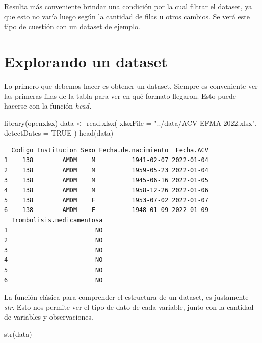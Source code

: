 \documentclass[
  letterpaper,
  DIV=11,
  numbers=noendperiod]{scrreprt}
\newenvironment{Shaded}{\begin{snugshade}}{\end{snugshade}}
\newcommand{\AttributeTok}[1]{\textcolor[rgb]{0.40,0.45,0.13}{#1}}
\newcommand{\ConstantTok}[1]{\textcolor[rgb]{0.56,0.35,0.01}{#1}}
\newcommand{\FunctionTok}[1]{\textcolor[rgb]{0.28,0.35,0.67}{#1}}
\newcommand{\NormalTok}[1]{\textcolor[rgb]{0.00,0.23,0.31}{#1}}
\newcommand{\OtherTok}[1]{\textcolor[rgb]{0.00,0.23,0.31}{#1}}
\newcommand{\StringTok}[1]{\textcolor[rgb]{0.13,0.47,0.30}{#1}}
\begin{document}
Resulta más conveniente brindar una condición por la cual filtrar el
dataset, ya que esto no varía luego según la cantidad de filas u otros
cambios. Se verá este tipo de cuestión con un dataset de ejemplo.

\hypertarget{explorando-un-dataset}{%
\section{Explorando un dataset}\label{explorando-un-dataset}}

Lo primero que debemos hacer es obtener un dataset. Siempre es
conveniente ver las primeras filas de la tabla para ver en qué formato
llegaron. Esto puede hacerse con la función \emph{head.}

\begin{Shaded}
\begin{Highlighting}[]
\FunctionTok{library}\NormalTok{(openxlsx)}
\NormalTok{data }\OtherTok{\textless{}{-}} \FunctionTok{read.xlsx}\NormalTok{(}
  \AttributeTok{xlsxFile =} \StringTok{"../data/ACV EFMA 2022.xlsx"}\NormalTok{,}
  \AttributeTok{detectDates =} \ConstantTok{TRUE}
\NormalTok{)}
\FunctionTok{head}\NormalTok{(data)}
\end{Highlighting}
\end{Shaded}

\begin{verbatim}
  Codigo Institucion Sexo Fecha.de.nacimiento  Fecha.ACV
1    138        AMDM    M          1941-02-07 2022-01-04
2    138        AMDM    M          1959-05-23 2022-01-04
3    138        AMDM    M          1945-06-16 2022-01-05
4    138        AMDM    M          1958-12-26 2022-01-06
5    138        AMDM    F          1953-07-02 2022-01-07
6    138        AMDM    F          1948-01-09 2022-01-09
  Trombolisis.medicamentosa
1                        NO
2                        NO
3                        NO
4                        NO
5                        NO
6                        NO
\end{verbatim}

La función clásica para comprender el estructura de un dataset, es
justamente \emph{str}. Esto nos permite ver el tipo de dato de cada
variable, junto con la cantidad de variables y observaciones.

\begin{Shaded}
\begin{Highlighting}[]
\FunctionTok{str}\NormalTok{(data)}
\end{Highlighting}
\end{Shaded}
\end{document}
